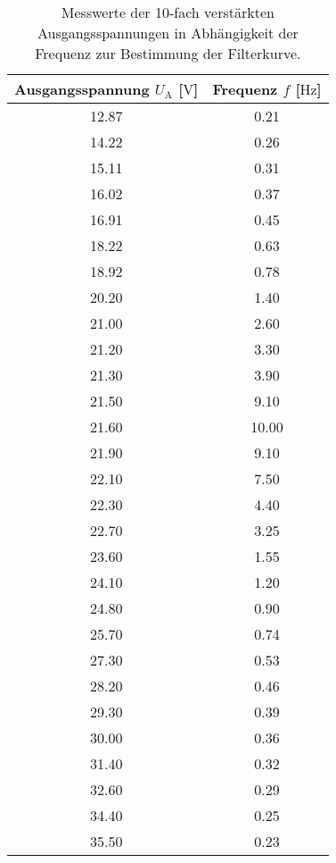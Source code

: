 \begin{table}
    \caption{Messwerte der 10-fach verstärkten Ausgangsspannungen in Abhängigkeit der Frequenz zur Bestimmung der Filterkurve.}
    \centering
    \label{tab:filterkurvewerte}
    \begin{tabular}{c c }
        \toprule
        Ausgangsspannung $U_{\text{A}}$ [$\si{\volt}$] & Frequenz $f$ [$\si{\hertz}$] \\
        \midrule
        12.87  &         0.21\\
        14.22  &         0.26\\
        15.11  &         0.31\\
        16.02  &         0.37\\
        16.91  &         0.45\\
        18.22  &         0.63\\
        18.92  &         0.78\\
        20.20  &         1.40\\
        21.00  &         2.60\\
        21.20  &         3.30\\
        21.30  &         3.90\\
        21.50  &         9.10\\
        21.60  &         10.00\\
        21.90  &         9.10\\
        22.10  &         7.50\\
        22.30  &         4.40\\
        22.70  &         3.25\\
        23.60  &         1.55\\
        24.10  &         1.20\\
        24.80  &         0.90\\
        25.70  &         0.74\\
        27.30  &         0.53\\
        28.20  &         0.46\\
        29.30  &         0.39\\
        30.00  &         0.36\\
        31.40  &         0.32\\
        32.60  &         0.29\\
        34.40  &         0.25\\
        35.50  &         0.23\\
        \bottomrule    
    \end{tabular}
\end{table}

